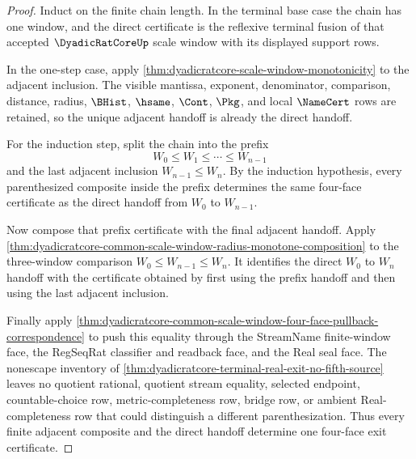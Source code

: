 \begin{proof}
Induct on the finite chain length. In the terminal base case the chain has one window, and the direct certificate is the reflexive terminal fusion of that accepted $\DyadicRatCoreUp$ scale window with its displayed support rows.

In the one-step case, apply \autoref{thm:dyadicratcore-scale-window-monotonicity} to the adjacent inclusion. The visible mantissa, exponent, denominator, comparison, distance, radius, $\BHist$, $\hsame$, $\Cont$, $\Pkg$, and local $\NameCert$ rows are retained, so the unique adjacent handoff is already the direct handoff.

For the induction step, split the chain into the prefix
$$
W_0 \leq W_1 \leq \cdots \leq W_{n-1}
$$
and the last adjacent inclusion $W_{n-1} \leq W_n$. By the induction hypothesis, every parenthesized composite inside the prefix determines the same four-face certificate as the direct handoff from $W_0$ to $W_{n-1}$.

Now compose that prefix certificate with the final adjacent handoff. Apply \autoref{thm:dyadicratcore-common-scale-window-radius-monotone-composition} to the three-window comparison $W_0 \leq W_{n-1} \leq W_n$. It identifies the direct $W_0$ to $W_n$ handoff with the certificate obtained by first using the prefix handoff and then using the last adjacent inclusion.

Finally apply \autoref{thm:dyadicratcore-common-scale-window-four-face-pullback-correspondence} to push this equality through the StreamName finite-window face, the RegSeqRat classifier and readback face, and the Real seal face. The nonescape inventory of \autoref{thm:dyadicratcore-terminal-real-exit-no-fifth-source} leaves no quotient rational, quotient stream equality, selected endpoint, countable-choice row, metric-completeness row, bridge row, or ambient Real-completeness row that could distinguish a different parenthesization. Thus every finite adjacent composite and the direct handoff determine one four-face exit certificate.
\end{proof}

